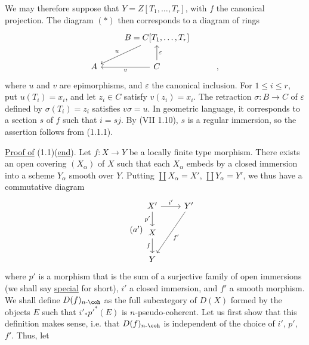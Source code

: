 We may therefore suppose that \(Y=Z[T_1,\ldots,T_r]\), with \(f\) the canonical projection. The diagram \((*)\) then corresponds to a diagram of rings
\[
\begin{tikzcd}
& B=C[T_1,\ldots,T_r] \arrow[dl,"u"'] & \\
A & C \arrow[l,"v"] \arrow[u,"\varepsilon"'] & {,}
\end{tikzcd}
\]
where \(u\) and \(v\) are epimorphisms, and \(\varepsilon\) the canonical inclusion. For \(1\leq i\leq r\), put \(u(T_i)=x_i\), and let \(z_i\in C\) satisfy \(v(z_i)=x_i\). The retraction \(\sigma:B\longrightarrow C\) of \(\varepsilon\) defined by \(\sigma(T_i)=z_i\) satisfies \(v\sigma=u\). In geometric language, it corresponds to a section \(s\) of \(f\) such that \(i=sj\). By (VII 1.10), \(s\) is a regular immersion, so the assertion follows from (1.1.1).

\uline{Proof of} (1.1)(\uline{end}). Let \(f:X\to Y\) be a locally finite type morphism. There exists an open covering \((X_\alpha)\) of \(X\) such that each \(X_\alpha\) embeds by a closed immersion into a scheme \(Y_\alpha\) smooth over \(Y\). Putting \(\coprod X_\alpha=X'\), \(\coprod Y_\alpha=Y'\), we thus have a commutative diagram
\begin{equation}\tag{$a'$}
\begin{tikzcd}
X' \arrow[r,"i'"] \arrow[d,"p'"'] & Y' \arrow[ddl,"f'"]\\
X \arrow[d,"f"']\\
Y
\end{tikzcd}
\end{equation}
where \(p'\) is a morphism that is the sum of a surjective family of open immersions (we shall say \uline{special} for short), \(i'\) a closed immersion, and \(f'\) a smooth morphism. We shall define \(D(f)_{n\text{-}\coh}\) as the full subcategory of \(D(X)\) formed by the objects \(E\) such that \(i'_*p'^*(E)\) is \(n\)-pseudo-coherent. Let us first show that this definition makes sense, i.e. that \(D(f)_{n\text{-}\coh}\) is independent of the choice of \(i'\), \(p'\), \(f'\). Thus, let

